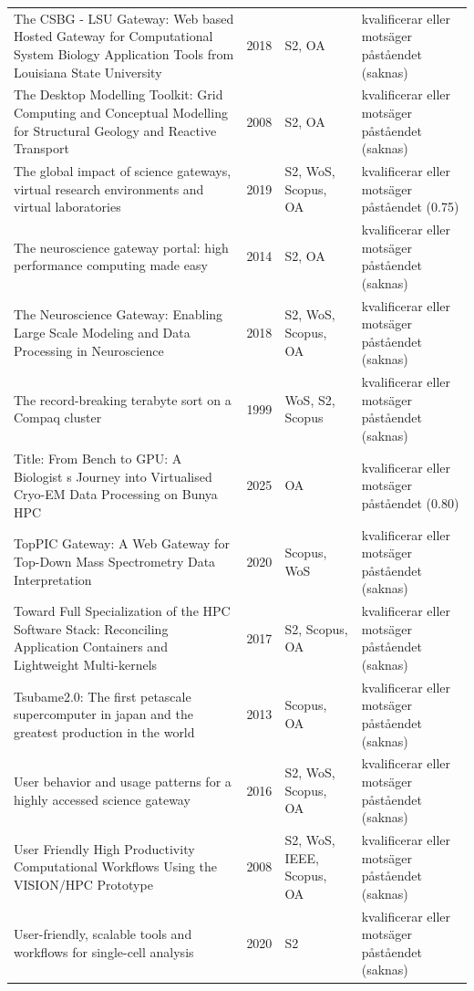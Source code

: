 \begin{longtable}{@{}%
  >{\raggedright\arraybackslash}p{}c%
  >{\raggedright\arraybackslash}p{}%
  >{\raggedright\arraybackslash}p{}@{}}
The CSBG - LSU Gateway: Web based Hosted Gateway for Computational System Biology Application Tools from Louisiana State University & 2018 & S2, OA & kvalificerar eller motsäger påståendet (saknas) \\
The Desktop Modelling Toolkit: Grid Computing and Conceptual Modelling for Structural Geology and Reactive Transport & 2008 & S2, OA & kvalificerar eller motsäger påståendet (saknas) \\
The global impact of science gateways, virtual research environments and virtual laboratories & 2019 & S2, WoS, Scopus, OA & kvalificerar eller motsäger påståendet (0.75) \\
The neuroscience gateway portal: high performance computing made easy & 2014 & S2, OA & kvalificerar eller motsäger påståendet (saknas) \\
The Neuroscience Gateway: Enabling Large Scale Modeling and Data Processing in Neuroscience & 2018 & S2, WoS, Scopus, OA & kvalificerar eller motsäger påståendet (saknas) \\
The record-breaking terabyte sort on a Compaq cluster & 1999 & WoS, S2, Scopus & kvalificerar eller motsäger påståendet (saknas) \\
Title: From Bench to GPU: A Biologist s Journey into Virtualised Cryo-EM Data Processing on Bunya HPC & 2025 & OA & kvalificerar eller motsäger påståendet (0.80) \\
TopPIC Gateway: A Web Gateway for Top-Down Mass Spectrometry Data Interpretation & 2020 & Scopus, WoS & kvalificerar eller motsäger påståendet (saknas) \\
Toward Full Specialization of the HPC Software Stack: Reconciling Application Containers and Lightweight Multi-kernels & 2017 & S2, Scopus, OA & kvalificerar eller motsäger påståendet (saknas) \\
Tsubame2.0: The first petascale supercomputer in japan and the greatest production in the world & 2013 & Scopus, OA & kvalificerar eller motsäger påståendet (saknas) \\
User behavior and usage patterns for a highly accessed science gateway & 2016 & S2, WoS, Scopus, OA & kvalificerar eller motsäger påståendet (saknas) \\
User Friendly High Productivity Computational Workflows Using the VISION/HPC Prototype & 2008 & S2, WoS, IEEE, Scopus, OA & kvalificerar eller motsäger påståendet (saknas) \\
User-friendly, scalable tools and workflows for single-cell analysis & 2020 & S2 & kvalificerar eller motsäger påståendet (saknas) \\

\end{longtable}
